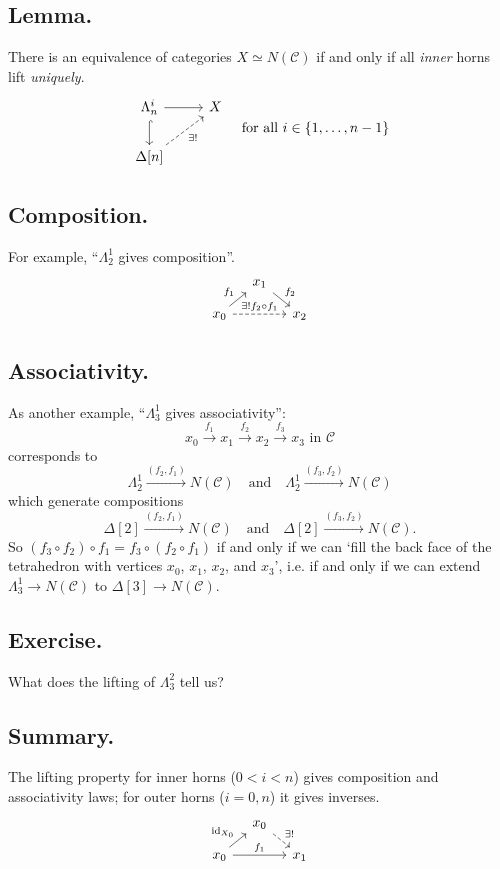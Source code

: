 \documentclass{article}
\numberwithin{equation}{subsection}
\renewcommand{\ss}[1]{\subsection{#1}}
\newcommand{\C}{\mathcal{C}}
\newcommand{\id}{\mathrm{id}}
\begin{document}
        \ss{Lemma.}
            There is an equivalence of categories $X\simeq N(\C)$ if and only if all \emph{inner} horns lift \emph{uniquely}.
            \[
                \begin{tikzcd}
                    \Lambda_n^i \rar \dar[hook] & X\\
                    \Delta[n] \urar[dashed,swap]{\exists!} &
                \end{tikzcd}
                \quad\text{for all }i\in\{1,\ldots,n-1\}
            \]
        \ss{Composition.}
            For example, ``$\Lambda_2^1$ gives composition''.
            \[
                \begin{tikzcd}[row sep=1em,column sep=1em]
                    &x_1\ar{dr}{f_2}&\\
                    x_0\ar{ur}{f_1}\ar[dashed]{rr}{\exists!f_2\circ f_1}&&x_2
                \end{tikzcd}
            \]

        \ss{Associativity.}
            As another example, ``$\Lambda_3^1$ gives associativity'':
            \[
                x_0\xrightarrow{f_1}x_1\xrightarrow{f_2}x_2\xrightarrow{f_3}x_3\text{ in }\C
            \]
            corresponds to
            \[
                \Lambda_2^1\xrightarrow{(f_2,f_1)}N(\C)
                \quad\text{and}\quad
                \Lambda_2^1\xrightarrow{(f_3,f_2)}N(\C)
            \]
            which generate compositions
            \[
                \Delta[2]\xrightarrow{(f_2,f_1)}N(\C)
                \quad\text{and}\quad
                \Delta[2]\xrightarrow{(f_3,f_2)}N(\C).
            \]
            So $(f_3\circ f_2)\circ f_1 = f_3\circ(f_2\circ f_1)$ if and only if we can `fill the back face of the tetrahedron with vertices $x_0$, $x_1$, $x_2$, and $x_3$', i.e. if and only if we can extend $\Lambda_3^1\to N(\C)$ to $\Delta[3]\to N(\C)$.

        \ss{Exercise.}
            What does the lifting of $\Lambda_3^2$ tell us?

        \ss{Summary.}
            The lifting property for inner horns ($0<i<n$) gives composition and associativity laws; for outer horns ($i=0,n$) it gives inverses.
            \[
                \begin{tikzcd}[row sep=1em,column sep=1em]
                    &x_0\ar[dashed]{dr}{\exists!}&\\
                    x_0\ar{ur}{\id_{X_0}}\ar{rr}{f_1}&&x_1
                \end{tikzcd}
            \]
\end{document}
